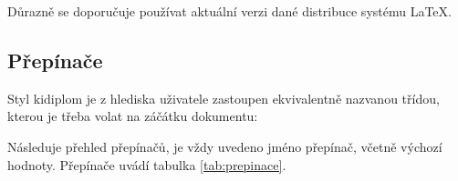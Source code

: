 \documentclass[
  program=itk,
  biblatex,
  language=czech,
  figures=false,
  glossaries,
  index
]{kidiplom}
\begin{document}
Důrazně se doporučuje používat aktuální verzi dané distribuce systému \LaTeX{}.


\subsection{Přepínače}
Styl kidiplom je z hlediska uživatele zastoupen ekvivalentně nazvanou třídou, kterou je třeba volat na záčátku dokumentu:

Následuje přehled přepínačů, je vždy uvedeno jméno přepínač, včetně výchozí hodnoty. Přepínače uvádí tabulka \ref{tab:prepinace}.
\end{document}
